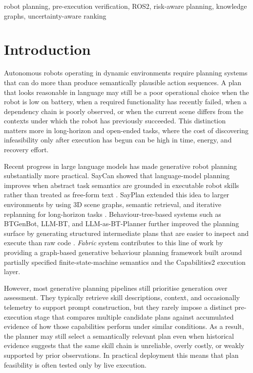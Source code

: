 \documentclass[letterpaper, 10pt, conference]{ieeeconf}
\begin{document}
\begin{keywords}
robot planning, pre-execution verification, ROS2, risk-aware planning, knowledge graphs, uncertainty-aware ranking
\end{keywords}

\section{Introduction}

Autonomous robots operating in dynamic environments require planning systems that can do more than produce semantically plausible action sequences. A plan that looks reasonable in language may still be a poor operational choice when the robot is low on battery, when a required functionality has recently failed, when a dependency chain is poorly observed, or when the current scene differs from the contexts under which the robot has previously succeeded. This distinction matters more in long-horizon and open-ended tasks, where the cost of discovering infeasibility only after execution has begun can be high in time, energy, and recovery effort.

Recent progress in large language models has made generative robot planning substantially more practical. SayCan showed that language-model planning improves when abstract task semantics are grounded in executable robot skills rather than treated as free-form text \cite{ahn_as_2022}. SayPlan extended this idea to larger environments by using 3D scene graphs, semantic retrieval, and iterative replanning for long-horizon tasks \cite{rana_sayplan_2023}. Behaviour-tree-based systems such as BTGenBot, LLM-BT, and LLM-as-BT-Planner further improved the planning surface by generating structured intermediate plans that are easier to inspect and execute than raw code \cite{izzo_btgenbot_2024, zhou_llm-bt_2024, ao_llm-as-bt-planner_2025}. \textit{Fabric} system \cite{ratnayake2026generativepartiallyspecifiedfinite} contributes to this line of work by providing a graph-based generative behaviour planning framework built around partially specified finite-state-machine semantics and the Capabilities2 execution layer.

However, most generative planning pipelines still prioritise generation over assessment. They typically retrieve skill descriptions, context, and occasionally telemetry to support prompt construction, but they rarely impose a distinct pre-execution stage that compares multiple candidate plans against accumulated evidence of how those capabilities perform under similar conditions. As a result, the planner may still select a semantically relevant plan even when historical evidence suggests that the same skill chain is unreliable, overly costly, or weakly supported by prior observations. In practical deployment this means that plan feasibility is often tested only by live execution.
\end{document}
